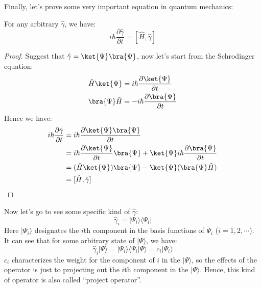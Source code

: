 Finally, let's prove some very important equation in quantum
mechanics:
\begin{theorem}\label{}
For any arbitrary  $\hat{\gamma}$, we have:
\begin{equation}\label{}
i \hbar\frac{\partial \hat{\gamma}}{\partial t} = [\hat{H},
\hat{\gamma}]
\end{equation}
\end{theorem}

\begin{proof}
Suggest that $\hat{\gamma} = \ket{\Psi}\bra{\Psi}$, now let's start
from the Schrodinger equation:
\begin{align}\label{}
\hat{H}\ket{\Psi} &= i \hbar \frac{\partial \ket{\Psi}}{\partial t}
\nonumber \\
\bra{\Psi}\hat{H} &= -i \hbar \frac{\partial \bra{\Psi}}{\partial t}
\end{align}
Hence we have:
\begin{equation}\label{}
\begin{split}
  i \hbar\frac{\partial \hat{\gamma}}{\partial t} &=
   i \hbar \frac{\partial \ket{\Psi}\bra{\Psi}}{\partial t}\\
    &=
    i \hbar \frac{\partial \ket{\Psi}}{\partial t}\bra{\Psi} +
    \ket{\Psi}i \hbar \frac{\partial \bra{\Psi}}{\partial t} \\
    &= (\hat{H}\ket{\Psi})\bra{\Psi} - \ket{\Psi}(\bra{\Psi}\hat{H})
    \\
    &= [\hat{H}, \hat{\gamma}]
\end{split}
\end{equation}
 \qedhere
\end{proof}

Now let's go to see some specific kind of $\hat{\gamma}$:
\begin{equation}\label{OPERATOReq:15}
\hat{\gamma}_{i} =|\Psi_{i}\rangle\langle\Psi_{i}|
\end{equation}
Here $|\Psi_{i}\rangle$ designates the $i$th component in the basis
functions of $\Psi_{i}$ ($i = 1, 2, \cdots$). It can see that for
some arbitrary state of $|\Psi\rangle$, we have:
\begin{equation}\label{}
\hat{\gamma}_{i}|\Psi\rangle =
|\Psi_{i}\rangle\langle\Psi_{i}|\Psi\rangle = c_{i}|\Psi_{i}\rangle
\end{equation}
$c_{i}$ characterizes the weight for the component of $i$ in the
$|\Psi\rangle$, so the effects of the operator is just to projecting
out the $i$th component in the $|\Psi\rangle$. Hence, this kind of
operator is also called ``project operator''.

